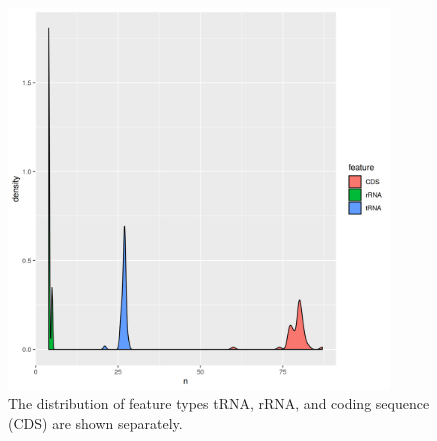 \documentclass{bmcart}
\begin{document}
\begin{backmatter}
\begin{figure}[h!]
  \centering
  \includegraphics[width=0.9\textwidth]{manuscript/plots/feature_counts_distinct.png}
  \caption{ The distribution of feature types tRNA, rRNA, and coding sequence (CDS) are shown separately.%
      }
      \label{fig:feature_count_novel}
      \end{figure}



\end{backmatter}
\end{document}
